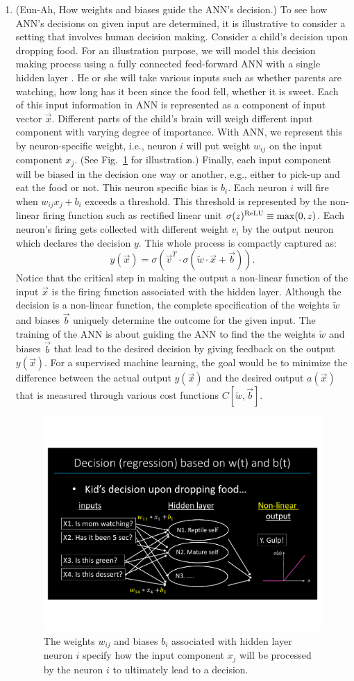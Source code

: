 \documentclass[aps,prb,floatfix,amsmath,amssymb,amsfonts,10pt,floatfix,longbibliography]{revtex4-1}
\begin{document}
\begin{enumerate}
\item (Eun-Ah, How weights and biases guide the ANN's decision.) To see how ANN's decisions on given input are determined, it is illustrative to consider a setting that involves human decision making. Consider a child's decision upon dropping food. For an illustration purpose, we will model this decision making process using a fully connected feed-forward ANN with a single hidden layer .\cite{Nielson2013} He or she will take various inputs such as whether parents are watching, how long has it been since the food fell, whether it is sweet. Each of this input information in ANN is represented as a component of input vector $\vec{x}$. Different parts of the child's brain will weigh different input component with varying degree of importance. With ANN, we represent this by neuron-specific weight, i.e., neuron $i$ will put weight $w_{ij}$ on the input component $x_j$. (See Fig.~\ref{fig:decision} for illustration.) Finally, each input component will be biased in the decision one way or another, e.g., either to pick-up and eat the food or not. This neuron specific bias is $b_i$. Each neuron $i$ will fire when $w_{ij}x_j+b_i$ exceeds a threshold. This threshold is represented by the non-linear firing function such as rectified linear unit $\sigma(z)^{\rm ReLU}\equiv {\rm max}(0,z)$. Each neuron's firing gets collected with different weight $v_i$ by the output neuron which declares the decision $y$. This whole process is compactly captured as: 
\begin{equation}
   y(\vec{x})= \sigma \left(\vec{v}^T\cdot\sigma(\tilde{w}\cdot\vec{x}+\vec{b})\right).
\end{equation}
Notice that the critical step in making the output a non-linear function of the input $\vec{x}$ is the firing function associated with the hidden layer. Although the decision is a non-linear function, the complete specification of the weights $\tilde{w}$ and biases $\vec{b}$ uniquely determine the outcome for the given input. The training of the ANN is about guiding the ANN to find the the weights $\tilde{w}$ and biases $\vec{b}$ that lead to the desired decision by giving feedback on the output $y(\vec{x})$. For a supervised machine learning, the goal would be to minimize the difference between the actual output $y(\vec{x})$ and the desired output $a(\vec{x})$ that is measured through various cost functions $C[\tilde{w},\vec{b}]$. 


	\begin{figure}[h]
	\includegraphics[width=.4\textwidth]{Figures/decision.pdf}
	\caption{\label{fig:decision}The weights $w_{ij}$ and biases $b_i$ associated with hidden layer neuron $i$ specify how the input component $x_j$ will be processed by the neuron $i$ to ultimately lead to a decision. }
	\end{figure}


\end{enumerate}
\end{document}
